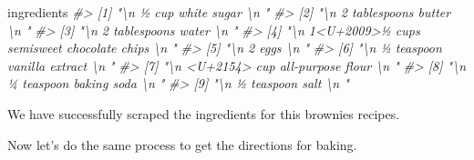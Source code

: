 \documentclass[
  12pt,
]{book}
\newenvironment{Shaded}{\begin{snugshade}}{\end{snugshade}}
\newcommand{\CommentTok}[1]{\textcolor[rgb]{0.37,0.37,0.37}{\textit{#1}}}
\newcommand{\NormalTok}[1]{#1}
\begin{document}
\begin{Shaded}
\begin{Highlighting}[]
\NormalTok{ingredients}
\CommentTok{\#\textgreater{} [1] "\textbackslash{}n                                                ½ cup white sugar \textbackslash{}n                                            "                 }
\CommentTok{\#\textgreater{} [2] "\textbackslash{}n                                                2 tablespoons butter \textbackslash{}n                                            "              }
\CommentTok{\#\textgreater{} [3] "\textbackslash{}n                                                2 tablespoons water \textbackslash{}n                                            "               }
\CommentTok{\#\textgreater{} [4] "\textbackslash{}n                                                1\textless{}U+2009\textgreater{}½ cups semisweet chocolate chips \textbackslash{}n                                            "}
\CommentTok{\#\textgreater{} [5] "\textbackslash{}n                                                2  eggs \textbackslash{}n                                            "                           }
\CommentTok{\#\textgreater{} [6] "\textbackslash{}n                                                ½ teaspoon vanilla extract \textbackslash{}n                                            "        }
\CommentTok{\#\textgreater{} [7] "\textbackslash{}n                                                \textless{}U+2154\textgreater{} cup all{-}purpose flour \textbackslash{}n                                            "    }
\CommentTok{\#\textgreater{} [8] "\textbackslash{}n                                                ¼ teaspoon baking soda \textbackslash{}n                                            "            }
\CommentTok{\#\textgreater{} [9] "\textbackslash{}n                                                ½ teaspoon salt \textbackslash{}n                                            "}
\end{Highlighting}
\end{Shaded}

We have successfully scraped the ingredients for this brownies recipes.

Now let's do the same process to get the directions for baking.
\end{document}
